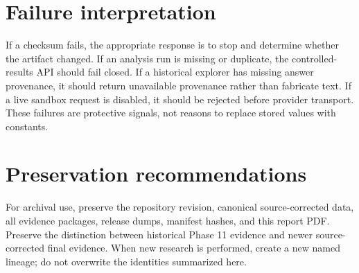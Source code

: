 \section{Failure interpretation}

If a checksum fails, the appropriate response is to stop and determine whether the artifact changed. If an analysis run is missing or duplicate, the controlled-results API should fail closed. If a historical explorer has missing answer provenance, it should return unavailable provenance rather than fabricate text. If a live sandbox request is disabled, it should be rejected before provider transport. These failures are protective signals, not reasons to replace stored values with constants.

\section{Preservation recommendations}

For archival use, preserve the repository revision, canonical source-corrected data, all evidence packages, release dumps, manifest hashes, and this report PDF. Preserve the distinction between historical Phase 11 evidence and newer source-corrected final evidence. When new research is performed, create a new named lineage; do not overwrite the identities summarized here.
